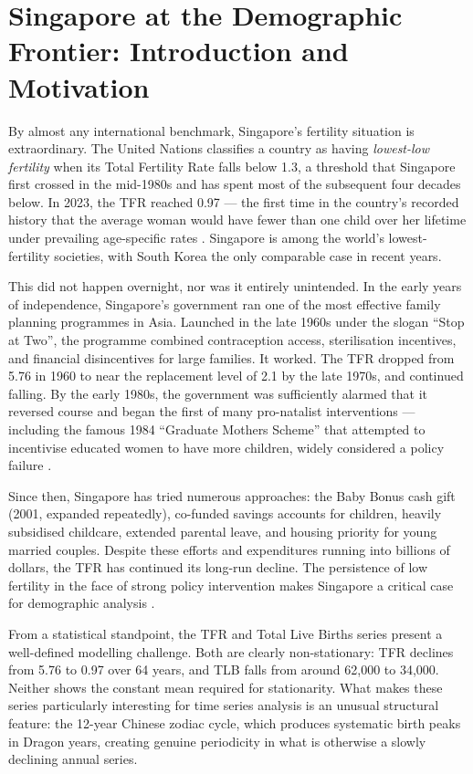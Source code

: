 \documentclass[12pt,a4paper]{article}
\begin{document}
\clearpage\tableofcontents\clearpage

\section{Singapore at the Demographic Frontier: Introduction and Motivation}
\label{sec:intro}

By almost any international benchmark, Singapore's fertility situation is extraordinary.
The United Nations classifies a country as having \emph{lowest-low fertility} when its
Total Fertility Rate falls below 1.3, a threshold that Singapore first crossed in the
mid-1980s and has spent most of the subsequent four decades below. In 2023, the TFR
reached 0.97 --- the first time in the country's recorded history that the average
woman would have fewer than one child over her lifetime under prevailing age-specific
rates \citep{singstat2025}. Singapore is among the world's lowest-fertility societies, with South Korea the
only comparable case in recent years.

This did not happen overnight, nor was it entirely unintended. In the early years of
independence, Singapore's government ran one of the most effective family planning
programmes in Asia. Launched in the late 1960s under the slogan ``Stop at Two'',
the programme combined contraception access, sterilisation incentives, and financial
disincentives for large families. It worked. The TFR dropped from 5.76 in 1960 to
near the replacement level of 2.1 by the late 1970s, and continued falling. By the
early 1980s, the government was sufficiently alarmed that it reversed course and
began the first of many pro-natalist interventions --- including the famous 1984
``Graduate Mothers Scheme'' that attempted to incentivise educated women to have more
children, widely considered a policy failure \citep{jones1990}.

Since then, Singapore has tried numerous approaches: the Baby Bonus cash gift (2001,
expanded repeatedly), co-funded savings accounts for children, heavily subsidised
childcare, extended parental leave, and housing priority for young married couples.
Despite these efforts and expenditures running into billions of dollars, the TFR
has continued its long-run decline. The persistence of low fertility in the face of
strong policy intervention makes Singapore a critical case for demographic analysis
\citep{mcdonald2006, bongaarts2002}.

From a statistical standpoint, the TFR and Total Live Births series present a
well-defined modelling challenge. Both are clearly non-stationary: TFR declines from
5.76 to 0.97 over 64 years, and TLB falls from around 62{,}000 to 34{,}000. Neither
shows the constant mean required for stationarity. What makes these series particularly
interesting for time series analysis is an unusual structural feature: the 12-year
Chinese zodiac cycle, which produces systematic birth peaks in Dragon years, creating
genuine periodicity in what is otherwise a slowly declining annual series.
\end{document}
